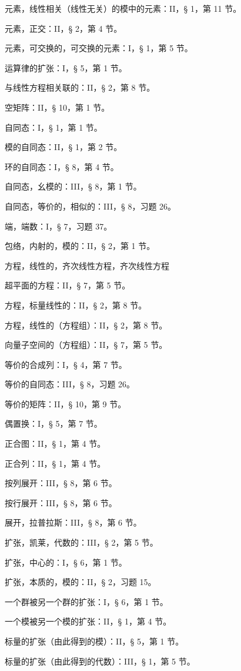 元素，线性相关（线性无关）的模中的元素：II，§ 1，第 11 节。

元素，正交：II，§ 2，第 4 节。

元素，可交换的，可交换的元素：I，§ 1，第 5 节。

运算律的扩张：I，§ 5，第 1 节。

与线性方程相关联的：II，§ 2，第 8 节。

空矩阵：II，§ 10，第 1 节。

自同态：I，§ 1，第 1 节。

模的自同态：II，§ 1，第 2 节。

环的自同态：I，§ 8，第 4 节。

自同态，幺模的：III，§ 8，第 1 节。

自同态，等价的，相似的：III，§ 8，习题 26。

端，端数：I，§ 7，习题 37。

包络，内射的，模的：II，§ 2，第 1 节。

方程，线性的，齐次线性方程，齐次线性方程

超平面的方程：II，§ 7，第 5 节。

方程，标量线性的：II，§ 2，第 8 节。

方程，线性的（方程组）：II，§ 2，第 8 节。

向量子空间的（方程组）：II，§ 7，第 5 节。

等价的合成列：I，§ 4，第 7 节。

等价的自同态：III，§ 8，习题 26。

等价的矩阵：II，§ 10，第 9 节。

偶置换：I，§ 5，第 7 节。

正合图：II，§ 1，第 4 节。

正合列：II，§ 1，第 4 节。

按列展开：III，§ 8，第 6 节。

按行展开：III，§ 8，第 6 节。

展开，拉普拉斯：III，§ 8，第 6 节。

扩张，凯莱，代数的：III，§ 2，第 5 节。

扩张，中心的：I，§ 6，第 1 节。

扩张，本质的，模的：II，§ 2，习题 15。

一个群被另一个群的扩张：I，§ 6，第 1 节。

一个模被另一个模的扩张：II，§ 1，第 4 节。

标量的扩张（由此得到的模）：II，§ 5，第 1 节。

标量的扩张（由此得到的代数）：III，§ 1，第 5 节。

